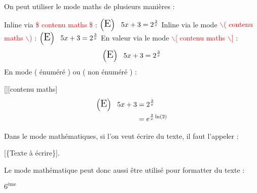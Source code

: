 On peut utiliser le mode maths de plusieurs manières : 
\begin{tcolorbox}[blank]
\begin{tcbenumerate}[2]
    \tcbitem Inline via \textcolor{red}{\$ contenu maths \$} : $\left(\text{\Large{E}}\right)~~5x + 3 = 2^\frac{3}{x}$
    \tcbitem Inline via le mode  \textcolor{red}{$\backslash$( contenu maths $\backslash$)} : \(\left(\text{\Large{E}}\right)~~5x + 3 = 2^\frac{3}{x}\)
    \tcbitem En valeur via le mode  \textcolor{red}{$\backslash$[ contenu maths $\backslash$]} : \[\left(\text{\Large{E}}\right)~~5x + 3 = 2^\frac{3}{x}\]
    \tcbitem En mode  ( énuméré ) ou  ( non énuméré ) :  
    
    [][contenu maths]
    \begin{align}
        \left(\text{\Large{E}}\right)~~5x + 3 &= 2^\frac{3}{x}\\
        &= e^{\frac{3}{x}\ln(2)}
    \end{align}
\end{tcbenumerate}

Dans le mode mathématiques, si l'on veut écrire du texte, il faut l'appeler  : 

[\{Texte à écrire\}].


Le mode mathématique peut donc aussi être utilisé pour formatter du texte : 

$6^{\text{ème}}$
\end{tcolorbox}